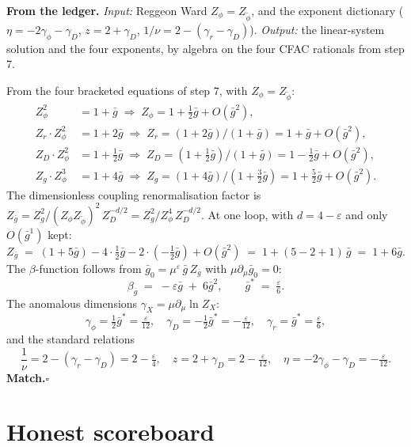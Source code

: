 \documentclass[11pt,a4paper]{article}
\begin{document}
\begin{cfacbox}
\textbf{From the ledger.} \emph{Input:} Reggeon Ward $Z_{\phi}=Z_{\widetilde\phi}$, and
the exponent dictionary ($\eta = -2\gamma_{\phi}-\gamma_{D}$, $z = 2 + \gamma_{D}$,
$1/\nu = 2-(\gamma_{r}-\gamma_{D})$). \emph{Output:} the linear-system solution and the
four exponents, by algebra on the four CFAC rationals from step 7.

\medskip
From the four bracketed equations of step 7, with $Z_{\phi}=Z_{\widetilde\phi}$:
\begin{align*}
Z_{\phi}^{2} &= 1 + \bar g \;\Rightarrow\; Z_{\phi} = 1 + \tfrac{1}{2}\bar g + O(\bar g^{2}), \\
Z_{r}\cdot Z_{\phi}^{2} &= 1 + 2\bar g \;\Rightarrow\; Z_{r} = (1+2\bar g)/(1+\bar g) = 1 + \bar g + O(\bar g^{2}), \\
Z_{D}\cdot Z_{\phi}^{2} &= 1 + \tfrac{1}{2}\bar g \;\Rightarrow\; Z_{D} = (1+\tfrac{1}{2}\bar g)/(1+\bar g) = 1 - \tfrac{1}{2}\bar g + O(\bar g^{2}), \\
Z_{g}\cdot Z_{\phi}^{3} &= 1 + 4\bar g \;\Rightarrow\; Z_{g} = (1+4\bar g)/(1+\tfrac{3}{2}\bar g) = 1 + \tfrac{5}{2}\bar g + O(\bar g^{2}).
\end{align*}
The dimensionless coupling renormalisation factor is
$Z_{\bar g} = Z_{g}^{2}/(Z_{\phi}Z_{\widetilde\phi})^{2}\,Z_{D}^{-d/2} = Z_{g}^{2}/Z_{\phi}^{4}\,Z_{D}^{-d/2}$.
At one loop, with $d=4-\varepsilon$ and only $O(\bar g^{1})$ kept:
\[
Z_{\bar g} \;=\; (1 + 5\bar g) - 4\!\cdot\!\tfrac{1}{2}\bar g - 2\!\cdot\!(-\tfrac{1}{2}\bar g) + O(\bar g^{2})
\;=\; 1 + (5 - 2 + 1)\,\bar g
\;=\; 1 + 6\bar g.
\]
The $\beta$-function follows from $\bar g_{0} = \mu^{\varepsilon}\,\bar g\,Z_{\bar g}$ with
$\mu\partial_{\mu}\bar g_{0}=0$:
\[
\boxed{\;\beta_{\bar g} \;=\; -\varepsilon\bar g \;+\; 6\bar g^{2}, \qquad \bar g^{*} \;=\; \tfrac{\varepsilon}{6}.\;}
\]
The anomalous dimensions $\gamma_{X}=\mu\partial_{\mu}\ln Z_{X}$:
\[
\gamma_{\phi} = \tfrac{1}{2}\bar g^{*} = \tfrac{\varepsilon}{12},\quad
\gamma_{D} = -\tfrac{1}{2}\bar g^{*} = -\tfrac{\varepsilon}{12},\quad
\gamma_{r} = \bar g^{*} = \tfrac{\varepsilon}{6},
\]
and the standard relations
\[
\frac{1}{\nu} = 2 - (\gamma_{r}-\gamma_{D}) = 2 - \tfrac{\varepsilon}{4},\quad
z = 2 + \gamma_{D} = 2 - \tfrac{\varepsilon}{12},\quad
\eta = -2\gamma_{\phi} - \gamma_{D} = -\tfrac{\varepsilon}{12}.
\]
\textbf{Match.}\hfill$\square$
\end{cfacbox}

\section*{Honest scoreboard}
\end{document}
